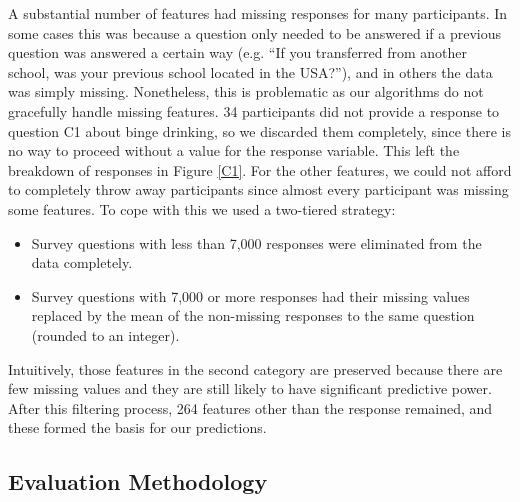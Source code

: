 A substantial number of features had missing responses for many participants.  In some cases this was because a question only needed to be answered if a previous question was answered a certain way (e.g. ``If you transferred from another school, was your previous school located in the USA?''), and in others the data was simply missing.  Nonetheless, this is problematic as our algorithms do not gracefully handle missing features.  34 participants did not provide a response to question C1 about binge drinking, so we discarded them completely, since there is no way to proceed without a value for the response variable.  This left the breakdown of responses in Figure \ref{C1}.  For the other features, we could not afford to completely throw away participants since almost every participant was missing some features.  To cope with this we used a two-tiered strategy:

\begin{itemize}
\item Survey questions with less than 7,000 responses were eliminated from the data completely.
\item Survey questions with 7,000 or more responses had their missing values replaced by the mean of the non-missing responses to the same question (rounded to an integer).
\end{itemize}

Intuitively, those features in the second category are preserved because there are few missing values and they are still likely to have significant predictive power.  After this filtering process, 264 features other than the response remained, and these formed the basis for our predictions.

\subsection{Evaluation Methodology}
